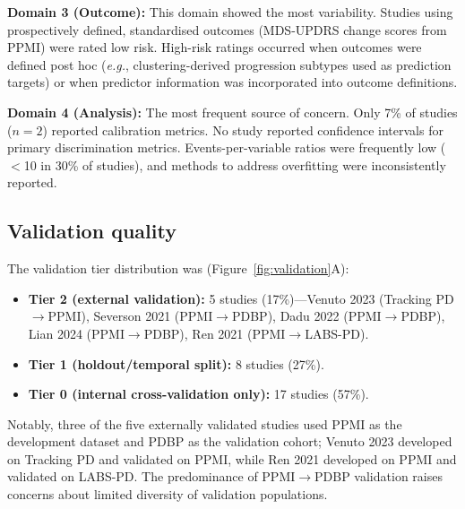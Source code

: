 \documentclass[11pt,a4paper]{article}
\newcommand{\eg}{\textit{e.g.}}
\begin{document}
\textbf{Domain 3 (Outcome):} This domain showed the most variability. Studies using prospectively defined, standardised outcomes (MDS-UPDRS change scores from PPMI) were rated low risk. High-risk ratings occurred when outcomes were defined post hoc (\eg, clustering-derived progression subtypes used as prediction targets) or when predictor information was incorporated into outcome definitions.

\textbf{Domain 4 (Analysis):} The most frequent source of concern. Only 7\% of studies ($n=2$) reported calibration metrics. No study reported confidence intervals for primary discrimination metrics. Events-per-variable ratios were frequently low ($<$10 in 30\% of studies), and methods to address overfitting were inconsistently reported.

\subsection{Validation quality}

The validation tier distribution was (Figure~\ref{fig:validation}A):
\begin{itemize}[leftmargin=*]
    \item \textbf{Tier 2 (external validation):} 5 studies (17\%)---Venuto 2023 (Tracking PD$\rightarrow$PPMI), Severson 2021 (PPMI$\rightarrow$PDBP), Dadu 2022 (PPMI$\rightarrow$PDBP), Lian 2024 (PPMI$\rightarrow$PDBP), Ren 2021 (PPMI$\rightarrow$LABS-PD).
    \item \textbf{Tier 1 (holdout/temporal split):} 8 studies (27\%).
    \item \textbf{Tier 0 (internal cross-validation only):} 17 studies (57\%).
\end{itemize}

\noindent Notably, three of the five externally validated studies used PPMI as the development dataset and PDBP as the validation cohort; Venuto 2023 developed on Tracking PD and validated on PPMI, while Ren 2021 developed on PPMI and validated on LABS-PD. The predominance of PPMI$\rightarrow$PDBP validation raises concerns about limited diversity of validation populations.
\end{document}
